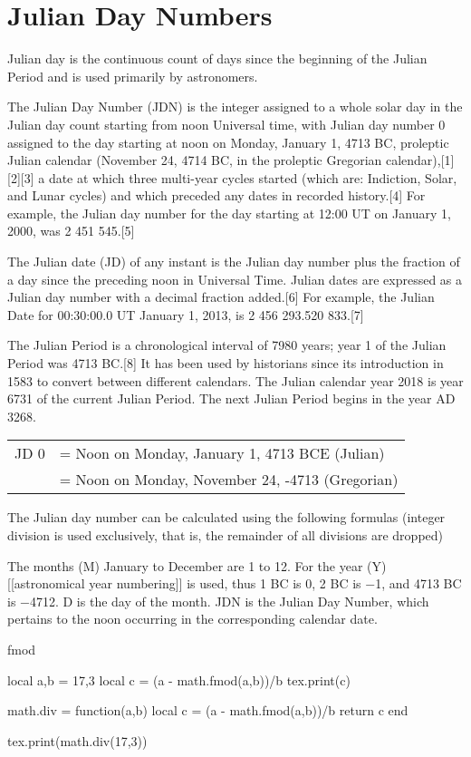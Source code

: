 \section{Julian Day Numbers}
Julian day is the continuous count of days since the beginning of the Julian Period and is used primarily by astronomers.

The Julian Day Number (JDN) is the integer assigned to a whole solar day in the Julian day count starting from noon Universal time, with Julian day number 0 assigned to the day starting at noon on Monday, January 1, 4713 BC, proleptic Julian calendar (November 24, 4714 BC, in the proleptic Gregorian calendar),[1][2][3] a date at which three multi-year cycles started (which are: Indiction, Solar, and Lunar cycles) and which preceded any dates in recorded history.[4] For example, the Julian day number for the day starting at 12:00 UT on January 1, 2000, was 2 451 545.[5]

The Julian date (JD) of any instant is the Julian day number plus the fraction of a day since the preceding noon in Universal Time. Julian dates are expressed as a Julian day number with a decimal fraction added.[6] For example, the Julian Date for 00:30:00.0 UT January 1, 2013, is 2 456 293.520 833.[7]

The Julian Period is a chronological interval of 7980 years; year 1 of the Julian Period was 4713 BC.[8] It has been used by historians since its introduction in 1583 to convert between different calendars. The Julian calendar year 2018 is year 6731 of the current Julian Period. The next Julian Period begins in the year AD 3268.


\begin{tabular}{l l} 
JD 0 &= Noon on Monday, January 1, 4713 BCE (Julian)\\
     &= Noon on Monday, November 24, -4713 (Gregorian)\\
\end{tabular}     
     
The Julian day number can be calculated using the following formulas (integer division is used exclusively, that is, the remainder of all divisions are dropped)

The months (M) January to December are 1 to 12. For the year (Y) [[astronomical year numbering]] is used, thus 1 BC is 0, 2 BC is −1, and 4713 BC is −4712. D is the day of the month. JDN is the Julian Day Number, which pertains to the noon occurring in the corresponding calendar date.

\begin{texexample}{fmod}{}
\begin{luacode}
local a,b = 17,3
local c = (a - math.fmod(a,b))/b
tex.print(c)

math.div = function(a,b) 
    local c = (a - math.fmod(a,b))/b
    return c
end

tex.print(math.div(17,3))   

\end{luacode}
\end{texexample}


\vfill




